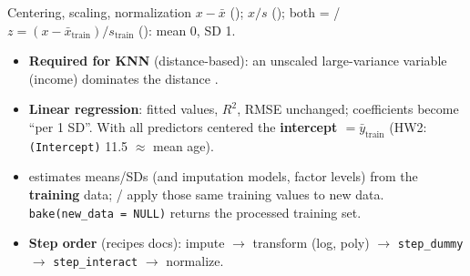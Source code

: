 \begin{topic}{Centering, scaling, normalization}
 $x-\bar x$ ();  $x/s$ (); both =  /  $z=(x-\bar x_{\text{train}})/s_{\text{train}}$ (): mean 0, SD 1.
\begin{itemize}
\item \textbf{Required for KNN} (distance-based): an unscaled large-variance variable (income) dominates the distance .
\item \textbf{Linear regression}: fitted values, $R^2$, RMSE unchanged; coefficients become ``per 1 SD''. With all predictors centered the \textbf{intercept $=\bar y_{\text{train}}$} (HW2: \texttt{(Intercept)} 11.5 $\approx$ mean age).
\item {} estimates means/SDs (and imputation models, factor levels) from the \textbf{training} data;  /  apply those same training values to new data. \texttt{bake(new\_data = NULL)} returns the processed training set.
\item \textbf{Step order} (recipes docs): impute $\to$ transform (log, poly) $\to$ \texttt{step\_dummy} $\to$ \texttt{step\_interact} $\to$ normalize.
\end{itemize}
\end{topic}

